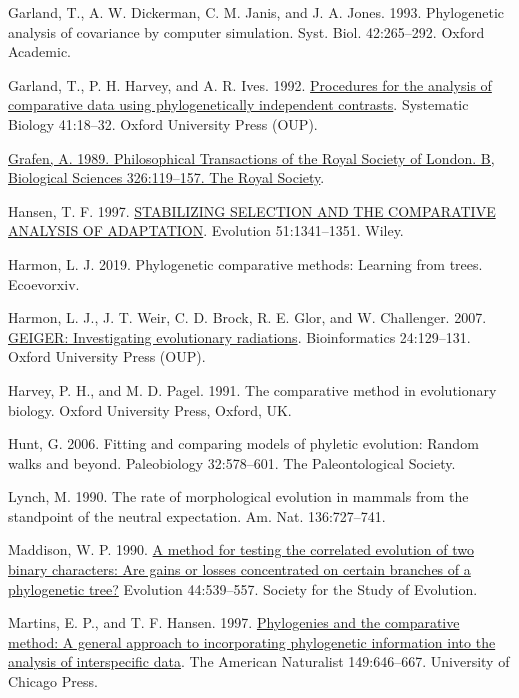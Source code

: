 \documentclass[fleqn,10pt,lineno]{wlpeerj} %
\newlength{\cslhangindent}
\newenvironment{CSLReferences}[2] %
 {\begin{list}{}{%
  \setlength{\itemindent}{0pt}
  \setlength{\leftmargin}{0pt}
  \setlength{\parsep}{0pt}
  \ifodd #1
   \setlength{\leftmargin}{\cslhangindent}
   \setlength{\itemindent}{-1\cslhangindent}
  \fi
  \setlength{\itemsep}{#2\baselineskip}}}
 {\end{list}}
\begin{document}
\begin{CSLReferences}{1}{0}
Garland, T., A. W. Dickerman, C. M. Janis, and J. A. Jones. 1993. Phylogenetic analysis of covariance by computer simulation. Syst. Biol. 42:265--292. Oxford Academic.

Garland, T., P. H. Harvey, and A. R. Ives. 1992. \href{https://doi.org/10.1093/sysbio/41.1.18}{Procedures for the analysis of comparative data using phylogenetically independent contrasts}. Systematic Biology 41:18--32. Oxford University Press (OUP).

\href{https://doi.org/10.1098/rstb.1989.0106}{Grafen, A. 1989. Philosophical Transactions of the Royal Society of London. B, Biological Sciences 326:119--157. The Royal Society}.

Hansen, T. F. 1997. \href{https://doi.org/10.1111/j.1558-5646.1997.tb01457.x}{STABILIZING SELECTION AND THE COMPARATIVE ANALYSIS OF ADAPTATION}. Evolution 51:1341--1351. Wiley.

Harmon, L. J. 2019. Phylogenetic comparative methods: Learning from trees. Ecoevorxiv.

Harmon, L. J., J. T. Weir, C. D. Brock, R. E. Glor, and W. Challenger. 2007. \href{https://doi.org/10.1093/bioinformatics/btm538}{GEIGER: Investigating evolutionary radiations}. Bioinformatics 24:129--131. Oxford University Press (OUP).

Harvey, P. H., and M. D. Pagel. 1991. The comparative method in evolutionary biology. Oxford University Press, Oxford, UK.

Hunt, G. 2006. Fitting and comparing models of phyletic evolution: Random walks and beyond. Paleobiology 32:578--601. The Paleontological Society.

Lynch, M. 1990. The rate of morphological evolution in mammals from the standpoint of the neutral expectation. Am. Nat. 136:727--741.

Maddison, W. P. 1990. \href{https://doi.org/10.2307/2409435}{A method for testing the correlated evolution of two binary characters: Are gains or losses concentrated on certain branches of a phylogenetic tree?} Evolution 44:539--557. Society for the Study of Evolution.

Martins, E. P., and T. F. Hansen. 1997. \href{https://doi.org/10.1086/286013}{Phylogenies and the comparative method: A general approach to incorporating phylogenetic information into the analysis of interspecific data}. The American Naturalist 149:646--667. University of Chicago Press.


\end{CSLReferences}
\end{document}
